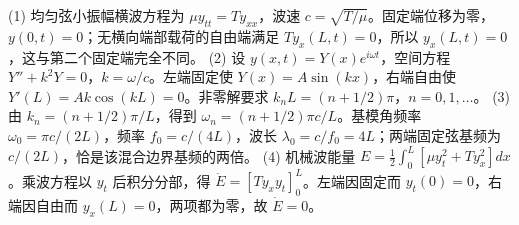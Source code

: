 (1) 均匀弦小振幅横波方程为 \(\mu y_{tt}=T y_{xx}\)，波速 \(c=\sqrt{T/\mu}\)。固定端位移为零，\(y(0,t)=0\)；无横向端部载荷的自由端满足 \(Ty_x(L,t)=0\)，所以 \(y_x(L,t)=0\)，这与第二个固定端完全不同。
(2) 设 \(y(x,t)=Y(x)e^{i\omega t}\)，空间方程 \(Y''+k^2Y=0\)，\(k=\omega/c\)。左端固定使 \(Y(x)=A\sin(kx)\)，右端自由使 \(Y'(L)=Ak\cos(kL)=0\)。非零解要求 \(k_nL=(n+1/2)\pi\)，\(n=0,1,\ldots\)。
(3) 由 \(k_n=(n+1/2)\pi/L\)，得到 \(\omega_n=(n+1/2)\pi c/L\)。基模角频率 \(\omega_0=\pi c/(2L)\)，频率 \(f_0=c/(4L)\)，波长 \(\lambda_0=c/f_0=4L\)；两端固定弦基频为 \(c/(2L)\)，恰是该混合边界基频的两倍。
(4) 机械波能量 \(E=\frac12\int_0^L[\mu y_t^2+T y_x^2]dx\)。乘波方程以 \(y_t\) 后积分分部，得 \(\dot E=[Ty_xy_t]_0^L\)。左端因固定而 \(y_t(0)=0\)，右端因自由而 \(y_x(L)=0\)，两项都为零，故 \(\dot E=0\)。
